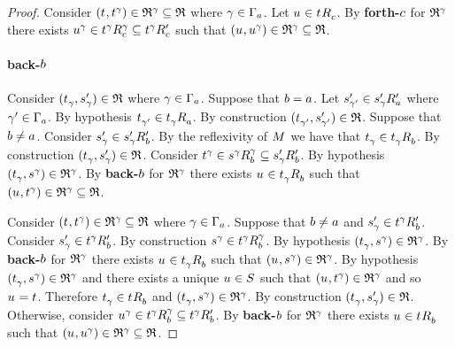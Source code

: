 \begin{proof}
Consider $(\kStateT, \kStateT[\gamma]) \in \refinement^\gamma \subseteq \refinement$ where $\gamma \in \Gamma_\agentA$.
Let $\kStateU \in \kSuccessorsC{\kStateT}$.
By {\bf forth-$\agentC$} for $\refinement^\gamma$ there exists $\kStateU[\gamma] \in \kSuccessorsC[\gamma]{\kStateT[\gamma]} \subseteq \kSuccessorsPC{\kStateT[\gamma]}$ such that $(\kStateU, \kStateU[\gamma]) \in \refinement^\gamma \subseteq \refinement$.

\paragraph{back-$\agentB$}
Consider $(\kStateT_\gamma, \kStateSP_\gamma) \in \refinement$ where $\gamma \in \Gamma_\agentA$.
Suppose that $\agentB = \agentA$.
Let $\kStateSP_{\gamma'} \in \kSuccessorsPA{\kStateSP_\gamma}$ where $\gamma' \in \Gamma_\agentA$.
By hypothesis $\kStateT_{\gamma'} \in \kSuccessorsA{\kStateT_\gamma}$.
By construction $(\kStateT_{\gamma'}, \kStateSP_{\gamma'}) \in \refinement$.
Suppose that $\agentB \neq \agentA$.
Consider $\kStateSP_\gamma \in \kSuccessorsPB{\kStateSP_\gamma}$.
By the reflexivity of $\kModel$ we have that $\kStateT_\gamma \in \kSuccessorsB{\kStateT_\gamma}$.
By construction $(\kStateT_\gamma, \kStateSP_\gamma) \in \refinement$.
Consider $\kStateT[\gamma] \in \kSuccessorsB[\gamma]{\kStateS[\gamma]} \subseteq \kSuccessorsPB{\kStateSP_\gamma}$.
By hypothesis $(\kStateT_\gamma, \kStateS[\gamma]) \in \refinement^\gamma$.
By {\bf back-$\agentB$} for $\refinement^\gamma$ there exists $\kStateU \in \kSuccessorsB{\kStateT_\gamma}$ such that $(\kStateU, \kStateT[\gamma]) \in \refinement^\gamma \subseteq \refinement$.

Consider $(\kStateT, \kStateT[\gamma]) \in \refinement^\gamma \subseteq \refinement$ where $\gamma \in \Gamma_\agentA$.
Suppose that $\agentB \neq \agentA$ and $\kStateSP_\gamma \in \kSuccessorsPB{\kStateT[\gamma]}$.
Consider $\kStateSP_\gamma \in \kSuccessorsPB{\kStateT[\gamma]}$.
By construction $\kStateS[\gamma] \in \kSuccessorsB[\gamma]{\kStateT[\gamma]}$.
By hypothesis $(\kStateT_\gamma, \kStateS[\gamma]) \in \refinement^\gamma$.
By {\bf back-$\agentB$} for $\refinement^\gamma$ there exists $\kStateU \in \kSuccessorsB{\kStateT_\gamma}$ such that $(\kStateU, \kStateS[\gamma]) \in \refinement^\gamma$.
By hypothesis $(\kStateT_\gamma, \kStateS[\gamma]) \in \refinement^\gamma$ and there exists a unique $\kStateU \in \kStates$ such that $(\kStateU, \kStateT[\gamma]) \in \refinement^\gamma$ and so $\kStateU = \kStateT$.
Therefore $\kStateT_\gamma \in \kSuccessorsB{\kStateT}$ and $(\kStateT_\gamma, \kStateS[\gamma]) \in \refinement^\gamma$.
By construction $(\kStateT_\gamma, \kStateSP_\gamma) \in \refinement$.
Otherwise, consider $\kStateU[\gamma] \in \kSuccessorsB[\gamma]{\kStateT[\gamma]} \subseteq \kSuccessorsPB{\kStateT[\gamma]}$.
By {\bf back-$\agentB$} for $\refinement^\gamma$ there exists $\kStateU \in \kSuccessorsB{\kStateT}$ such that $(\kStateU, \kStateU[\gamma]) \in \refinement^\gamma \subseteq \refinement$.


\end{proof}
